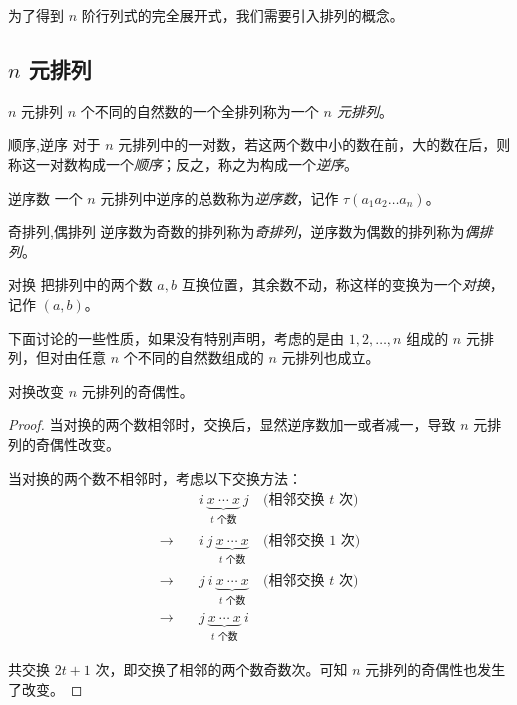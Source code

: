 为了得到 $n$ 阶行列式的完全展开式，我们需要引入排列的概念。

\subsection{$n$ 元排列}

\begin{definition}{$n$ 元排列}
	$n$ 个不同的自然数的一个全排列称为一个 \emph{$n$ 元排列}。
\end{definition}

\begin{definition}{顺序,逆序}
	对于 $n$ 元排列中的一对数，若这两个数中小的数在前，大的数在后，则称这一对数构成一个\emph{顺序}；反之，称之为构成一个\emph{逆序}。
\end{definition}

\begin{definition}{逆序数}
	一个 $n$ 元排列中逆序的总数称为\emph{逆序数}，记作 $\tau(a_1 a_2 \ldots a_n)$。
\end{definition}

\begin{definition}{奇排列,偶排列}
	逆序数为奇数的排列称为\emph{奇排列}，逆序数为偶数的排列称为\emph{偶排列}。
\end{definition}

\begin{definition}{对换}
	把排列中的两个数 $a, b$ 互换位置，其余数不动，称这样的变换为一个\emph{对换}，记作 $(a, b)$。
\end{definition}

下面讨论的一些性质，如果没有特别声明，考虑的是由 $1, 2, \ldots, n$ 组成的 $n$ 元排列，但对由任意 $n$ 个不同的自然数组成的 $n$ 元排列也成立。

\begin{theorem}
	对换改变 $n$ 元排列的奇偶性。
\end{theorem}

\begin{proof}
	当对换的两个数相邻时，交换后，显然逆序数加一或者减一，导致 $n$ 元排列的奇偶性改变。

	当对换的两个数不相邻时，考虑以下交换方法：
	$$
	\begin{aligned}
		& i~\underset{\text{$t$ 个数}}{\underbrace{x~\cdots~x}}~j & \pod{\text{相邻交换 $t$ 次}}
		\\
		\longrightarrow \quad & i~j~\underset{\text{$t$ 个数}}{\underbrace{x~\cdots~x}} & \pod{\text{相邻交换 $1$ 次}}
		\\
		\longrightarrow \quad & j~i~\underset{\text{$t$ 个数}}{\underbrace{x~\cdots~x}} & \pod{\text{相邻交换 $t$ 次}}
		\\
		\longrightarrow \quad & j~\underset{\text{$t$ 个数}}{\underbrace{x~\cdots~x}}~i
	\end{aligned}
	$$

	共交换 $2t + 1$ 次，即交换了相邻的两个数奇数次。可知 $n$ 元排列的奇偶性也发生了改变。
\end{proof}

